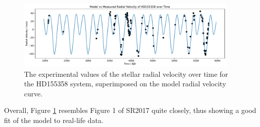 \documentclass{article}
\begin{document}
\begin{figure}[htp]
    \centering
    \includegraphics[width=0.95\textwidth]{q3f2.pdf}
    \captionsetup{justification=centering}
    \caption{The experimental values of the stellar radial velocity over time for the HD155358 system, superimposed on the model radial velocity curve.}
    \label{fig:q3f2}
\end{figure}

Overall, Figure \ref{fig:q3f2} resembles Figure 1 of SR2017 quite closely, thus showing a good fit of the model to real-life data.

\end{document}
